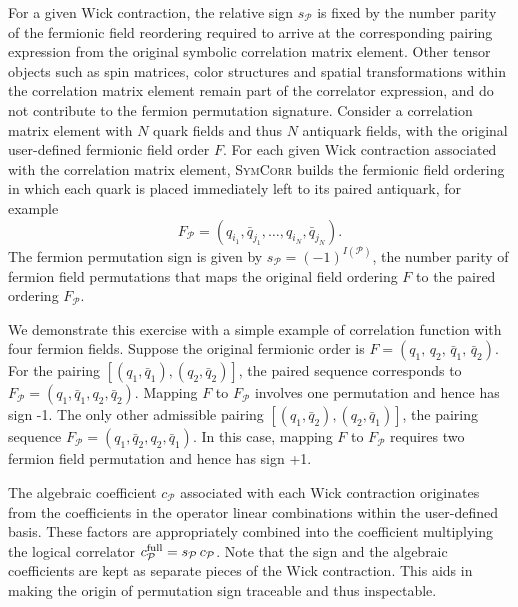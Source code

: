 \documentclass[a4paper,fleqn]{cas-dc}
\begin{document}
For a given Wick contraction, the relative sign $s_{\mathcal P}$ is fixed by the number parity of the fermionic field reordering required to arrive at the corresponding pairing expression from the original symbolic correlation matrix element. Other tensor objects such as spin matrices, color structures and spatial transformations within the correlation matrix element remain part of the correlator expression, and do not contribute to the fermion permutation signature. Consider a correlation matrix element with $N$ quark fields and thus $N$ antiquark fields, with the original user-defined fermionic field order $F$. For each given Wick contraction associated with the correlation matrix element, \textsc{SymCorr} builds the fermionic field ordering in which each quark is placed immediately left to its paired antiquark, for example
\begin{equation}
F_{\mathcal P} =(q_{i_1},\bar q_{j_1},\ldots, q_{i_N},\bar q_{j_N}).
\end{equation}
The fermion permutation sign is given by $s_{\mathcal P}=(-1)^{I(\mathcal P)}$, the number parity of fermion field permutations that maps the original field ordering $F$ to the paired ordering $F_{\mathcal P}$. 

We demonstrate this exercise with a simple example of correlation function with four fermion fields. Suppose the original fermionic order is $F=(q_1,\,q_2,\,\bar q_1,\,\bar q_2)$. For the pairing $[(q_1,\bar q_1), (q_2,\bar q_2)]$, the paired sequence corresponds to $F_{\mathcal P} =(q_{1},\bar q_{1},q_{2},\bar q_{2})$. Mapping $F$ to $F_{\mathcal P}$ involves one permutation and hence has sign -1. The only other admissible pairing $[(q_1,\bar q_2), (q_2,\bar q_1)]$, the pairing sequence $F_{\mathcal P} =(q_{1},\bar q_{2},q_{2},\bar q_{1})$. In this case, mapping $F$ to $F_{\mathcal P}$ requires two fermion field permutation and hence has sign +1. 

The algebraic coefficient $c_{\mathcal P}$ associated with each Wick contraction originates from the coefficients in the operator linear combinations within the user-defined basis. These factors are appropriately combined into the coefficient multiplying the logical correlator $c_{\mathcal P}^{\rm full}=s_{\mathcal P}\,c_{\mathcal P}$. Note that the sign and the algebraic coefficients are kept as separate pieces of the Wick contraction. This aids in making the origin of permutation sign traceable and thus
inspectable. 
\end{document}
